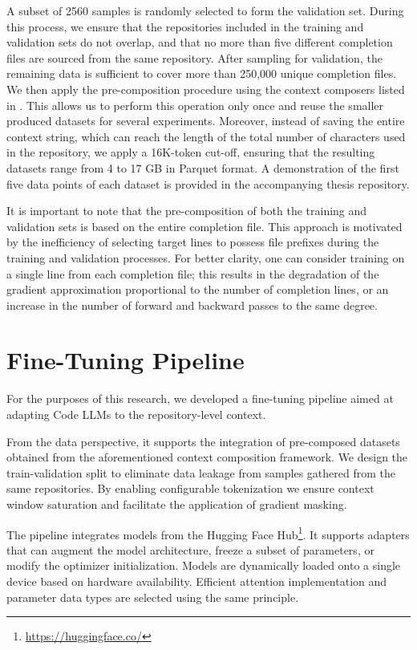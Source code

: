 A subset of 2560 samples is randomly selected to form the validation set. During this process, we ensure that the repositories included in the training and validation sets do not overlap, and that no more than five different completion files are sourced from the same repository. After sampling for validation, the remaining data is sufficient to cover more than 250,000 unique completion files. We then apply the pre-composition procedure using the context composers listed in . This allows us to perform this operation only once and reuse the smaller produced datasets for several experiments. Moreover, instead of saving the entire context string, which can reach the length of the total number of characters used in the repository, we apply a 16K-token cut-off, ensuring that the resulting datasets range from 4 to 17 GB in Parquet format. A demonstration of the first five data points of each dataset is provided in the accompanying thesis repository.

It is important to note that the pre-composition of both the training and validation sets is based on the entire completion file. This approach is motivated by the inefficiency of selecting target lines to possess file prefixes during the training and validation processes. For better clarity, one can consider training on a single line from each completion file; this results in the degradation of the gradient approximation proportional to the number of completion lines, or an increase in the number of forward and backward passes to the same degree.

\section{Fine-Tuning Pipeline}

For the purposes of this research, we developed a fine-tuning pipeline aimed at adapting Code LLMs to the repository-level context.

From the data perspective, it supports the integration of pre-composed datasets obtained from the aforementioned context composition framework. We design the train-validation split to eliminate data leakage from samples gathered from the same repositories. By enabling configurable tokenization we ensure context window saturation and facilitate the application of gradient masking.

The pipeline integrates models from the Hugging Face Hub\footnote{\url{https://huggingface.co/}}. It supports adapters that can augment the model architecture, freeze a subset of parameters, or modify the optimizer initialization. Models are dynamically loaded onto a single device based on hardware availability. Efficient attention implementation and parameter data types are selected using the same principle.

